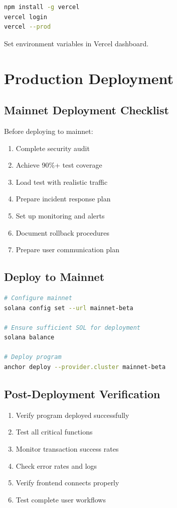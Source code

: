 \documentclass[a4paper,13pt,twoside]{report}
\theoremstyle{definition}
\begin{document}
\begin{lstlisting}[language=bash]
npm install -g vercel
vercel login
vercel --prod
\end{lstlisting}

Set environment variables in Vercel dashboard.

\section{Production Deployment}

\subsection{Mainnet Deployment Checklist}

Before deploying to mainnet:

\begin{enumerate}
    \item Complete security audit
    \item Achieve 90\%+ test coverage
    \item Load test with realistic traffic
    \item Prepare incident response plan
    \item Set up monitoring and alerts
    \item Document rollback procedures
    \item Prepare user communication plan
\end{enumerate}

\subsection{Deploy to Mainnet}

\begin{lstlisting}[language=bash]
# Configure mainnet
solana config set --url mainnet-beta

# Ensure sufficient SOL for deployment
solana balance

# Deploy program
anchor deploy --provider.cluster mainnet-beta
\end{lstlisting}

\subsection{Post-Deployment Verification}

\begin{enumerate}
    \item Verify program deployed successfully
    \item Test all critical functions
    \item Monitor transaction success rates
    \item Check error rates and logs
    \item Verify frontend connects properly
    \item Test complete user workflows
\end{enumerate}
\end{document}
